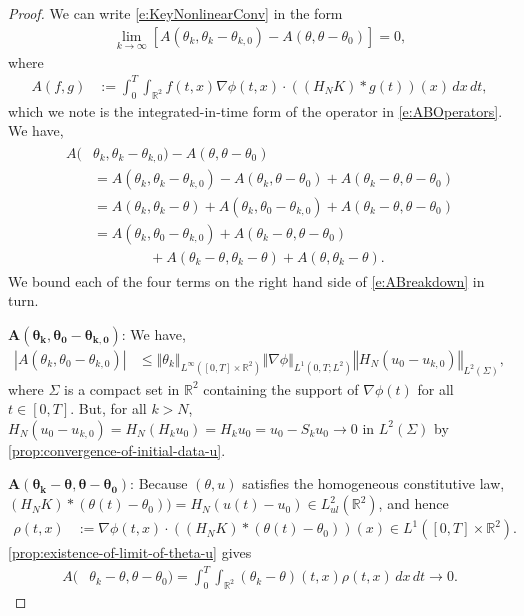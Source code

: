 \documentclass[10pt,a4paper]{amsart}
\def\R{{\mathbb R}}
\newcommand{\abs}[1]{\left\vert#1\right\vert}
\newcommand{\brac}[1]{\ensuremath{\left[ #1 \right]}}
\newcommand{\grad}{\ensuremath{\nabla}}
\newcommand{\iny}{\ensuremath{\infty}}
\newcommand{\norm}[1]{\ensuremath{\left\Vert #1 \right\Vert}}
\begin{document}
    \begin{proof}
    We can write \cref{e:KeyNonlinearConv} in the form
    \begin{align*}
    	\lim_{k \to \iny}
			\brac{A(\theta_k, \theta_k - \theta_{k, 0})
				- A(\theta, \theta - \theta_0)}
			= 0,
    \end{align*}
    where
    \begin{align*}
    	A(f, g)
			&:= \int_0^T \int_{\R^2} f(t, x)
    	    \grad \phi(t,x) \cdot ((H_N K) * g(t))(x)
        	    \, dx \, dt,
    \end{align*}
    which we note is the integrated-in-time form of the operator in \cref{e:ABOperators}. We have,
    \begin{align}\label{e:ABreakdown}
    	\begin{split}
    	A(&\theta_k, \theta_k - \theta_{k, 0})
				- A(\theta, \theta - \theta_0) \\
			&= A(\theta_k, \theta_k - \theta_{k, 0})
				- A(\theta_k, \theta - \theta_0)
				+ A(\theta_k - \theta, \theta - \theta_0) \\
			&= A(\theta_k, \theta_k - \theta)
				+ A(\theta_k, \theta_0 - \theta_{k, 0})
				+ A(\theta_k - \theta, \theta - \theta_0) \\
			&=  A(\theta_k, \theta_0 - \theta_{k, 0})
				+ A(\theta_k - \theta, \theta - \theta_0) \\
			&\qquad\qquad
				+ A(\theta_k - \theta, \theta_k - \theta)
                + A(\theta, \theta_k - \theta).
		\end{split}
    \end{align}
    We bound each of the four terms on the right hand side of 
    \cref{e:ABreakdown} in turn.
    
	\smallskip\noindent$\boldsymbol{A(\theta_k,
		\theta_0 - \theta_{k, 0})}$:
	We have,
	\begin{align*}
		\abs{A(\theta_k, \theta_0 - \theta_{k, 0})}
			&\le \norm{\theta_k}_{L^\iny([0, T] \times \R^2)}
				\norm{\grad \phi}_{L^1(0, T; L^2)}
				\norm{H_N(u_0 - u_{k, 0})}_{L^2(\Sigma)},
	\end{align*}
	where $\Sigma$ is a compact set in $\R^2$ containing the support of $\grad \phi(t)$ for all $t \in [0, T]$. But, for all $k > N$, $H_N (u_0 - u_{k,0}) = H_N(H_k u_0) = H_k u_0 = u_0 - S_k u_0 \to 0$ in $L^2(\Sigma)$ by \cref{prop:convergence-of-initial-data-u}.

    \smallskip\noindent$\boldsymbol{A(\theta_k - \theta,
    	\theta - \theta_0)}$:
    Because $(\theta, u)$ satisfies the homogeneous constitutive law,  $(H_N K) * (\theta(t) - \theta_0)) = H_N (u(t) - u_0) \in L^2_{ul}(\R^2)$, and hence
	\begin{align*}
		\rho(t, x)
			&:= \grad \phi(t,x) \cdot
            	((H_N K) * (\theta(t) - \theta_0))(x)
			\in L^1([0, T] \times \R^2).
	\end{align*}
	\cref{prop:existence-of-limit-of-theta-u} gives
	\begin{align*}
		A(&\theta_k - \theta, \theta - \theta_0)
			= \int_0^T\int_{\R^2} (\theta_k - \theta) (t, x)
				\rho(t, x)
            \, dx \, dt
            \to 0.
	\end{align*}


\end{proof}
\end{document}
